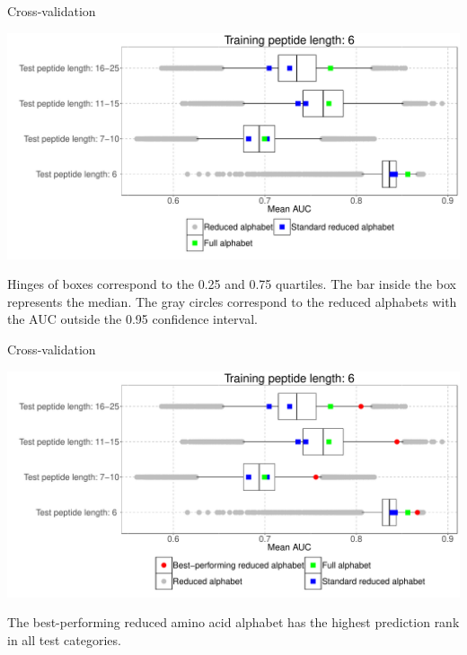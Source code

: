 \documentclass{beamer}\usepackage[]{graphicx}\usepackage[]{color}
\makeatletter
\def\maxwidth{ %
  \ifdim\Gin@nat@width>\linewidth
    \linewidth
  \else
    \Gin@nat@width
  \fi
}
\newenvironment{knitrout}{}{} %
\makeatother
\begin{document}
\begin{frame}{Cross-validation}
\begin{knitrout}
\color{fgcolor}

{\centering \includegraphics[width=\maxwidth]{figure/unnamed-chunk-3-1} 

}



\end{knitrout}
  \tiny
Hinges of boxes correspond to 
the 0.25 and 0.75 quartiles. The bar inside the box represents the median. The 
gray circles correspond to the reduced alphabets with the AUC outside the 0.95 
confidence interval.

  
  \end{frame}

  
    \begin{frame}{Cross-validation}
\begin{knitrout}
\color{fgcolor}

{\centering \includegraphics[width=\maxwidth]{figure/unnamed-chunk-4-1} 

}



\end{knitrout}
  

The best-performing reduced amino acid alphabet has the highest prediction rank in all test categories.
  
  \end{frame}
  
\end{document}
